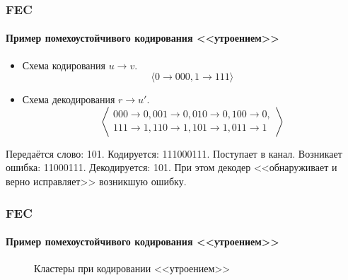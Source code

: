 \begin{frame}
    \frametitle{FEC}
    \framesubtitle{Пример помехоустойчивого кодирования <<утроением>>}

    \begin{itemize}
        \item Схема кодирования $u\to v$.
        \[
            \langle
                0\to 000,1\to 111
            \rangle
        \]
        
        \item Схема декодирования $r\to u'$.
        \[
            \left\langle
                \begin{split}
                    000\to 0,001\to 0,010\to 0,100\to 0,\\
                    111\to 1,110\to 1,101\to 1,011\to 1
                \end{split}
            \right\rangle
        \]
    \end{itemize}
    
    \begin{example}
    Передаётся слово: 101. Кодируется: 111000111. Поступает в канал. Возникает ошибка: 11000111. Декодируется: 101. При этом декодер <<обнаруживает и верно исправляет>> возникшую ошибку.
    \end{example}
\end{frame}


\begin{frame}
    \frametitle{FEC}
    \framesubtitle{Пример помехоустойчивого кодирования <<утроением>>}
    
    \begin{figure}
        \begin{center}
            \caption{Кластеры при кодировании <<утроением>>}\label{pict:fecTriplet}
        \end{center}
    \end{figure} 
\end{frame}


